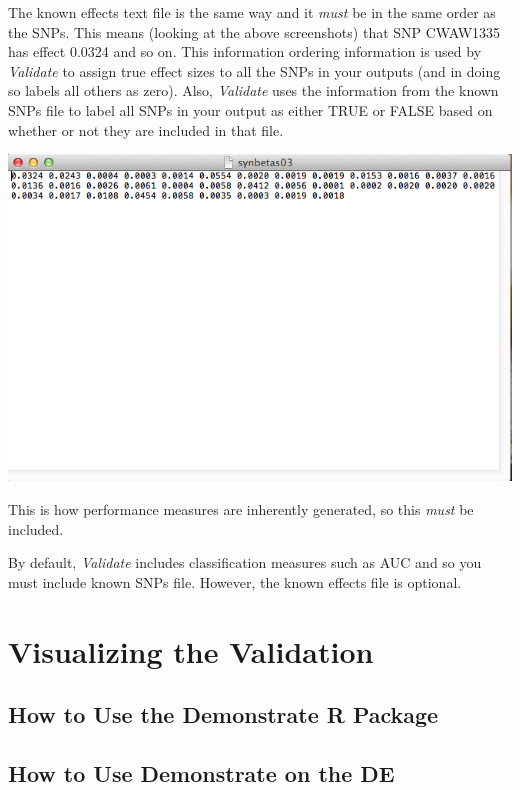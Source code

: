 \documentclass[twoside,a4paper]{refart}
\begin{document}
The known effects text file is the same way and it \textit{must} be in the same order as the SNPs. This means (looking at the above screenshots) that SNP CWAW1335 has effect 0.0324 and so on. This information ordering information is used by \textit{Validate} to assign true effect sizes to all the SNPs in your outputs (and in doing so labels all others as zero). Also, \textit{Validate} uses the information from the known SNPs file to label all SNPs in your output as either TRUE or FALSE based on whether or not they are included in that file. 

\includegraphics[width=\textwidth]{doc_step3_3}

This is how performance measures are inherently generated, so this \textit{must} be included.

By default, \textit{Validate} includes classification measures such as AUC and so you must include known SNPs file. However, the known effects file is optional. 



\section{Visualizing the Validation}

\subsection{How to Use the Demonstrate R Package}

\subsection{How to Use Demonstrate on the DE}
\end{document}
